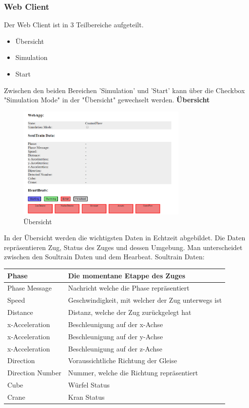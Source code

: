 \documentclass[../../main.tex]{subfiles}
\begin{document}
\subsubsection{Web Client}
Der Web Client ist in 3 Teilbereiche aufgeteilt.
\begin{itemize}
    \item Übersicht
    \item Simulation
    \item Start
\end{itemize}
Zwischen den beiden Bereichen 'Simulation' und 'Start' kann über die Checkbox "Simulation Mode" in der "Übersicht" gewechselt werden.
\textbf{Übersicht}
\begin{figure}[H] \centering
    \includegraphics[width=0.75\textwidth]{UebersichtWebApp}
    \caption{Übersicht}
    \label{fig:Uebersicht}
\end{figure}
In der Übersicht werden die wichtigsten Daten in Echtzeit abgebildet. Die Daten repräsentieren Zug, Status des Zuges und dessen Umgebung. 
Man unterscheidet zwischen den Soultrain Daten und dem Hearbeat.
Soultrain Daten:

\begin{table}[H]
    \begin{tabular}{ll}
    \hline
    Phase & Die momentane Etappe des Zuges \\ \hline
    Phase Message & Nachricht welche die Phase repräsentiert\\ \hline
    Speed & Geschwindigkeit, mit welcher der Zug unterwegs ist\\ \hline
    Distance & Distanz, welche der Zug zurückgelegt hat\\ \hline
    x-Acceleration & Beschleunigung auf der x-Achse  \\ \hline
    x-Acceleration & Beschleunigung auf der y-Achse \\ \hline
    x-Acceleration & Beschleunigung auf der z-Achse \\ \hline
    Direction & Voraussichtliche Richtung der Gleise \\ \hline
    Direction Number & Nummer, welche die Richtung repräsentiert \\ \hline
    Cube & Würfel Status \\ \hline
    Crane & Kran Status \\ \hline
    \end{tabular}
\end{table}
\end{document}
